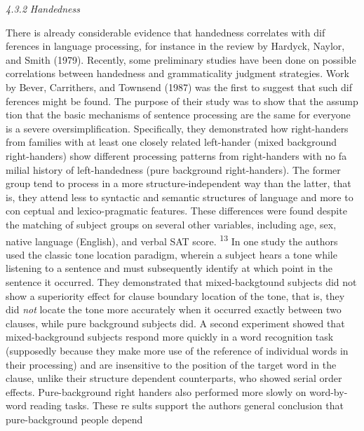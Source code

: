 \begin{styleStandard}
\textit{4.3.}\textit{2}\textit{ }\textit{Handedness}
\end{styleStandard}


\begin{styleTextbody}
There is already considerable evidence that handedness correlates with dif\- ferences in language processing, for instance in the review by Hardyck, Naylor, and Smith (1979). Recently, some preliminary studies have been done on possible correlations between handedness and grammaticality judgment strategies. Work by Bever, Carrithers, and Townsend (1987) was the first to suggest that such dif\- ferences might be found. The purpose of their study was to show that the assump\- tion that the basic mechanisms of sentence processing are the same for everyone is a severe oversimplification. Specifically, they demonstrated how right-handers from families with at least one closely related left-hander ({\textquotedbl}mixed background right-handers{\textquotedbl}) show different processing patterns from right-handers with no fa\- milial history of left-handedness ({\textquotedbl}pure background right-handers{\textquotedbl}). The former group tend to process in a more structure-independent way than the latter, that is, they attend less to syntactic and semantic structures of language and more to con\- ceptual and lexico-pragmatic features. These differences were found despite the matching of subject groups on several other variables, including age, sex, native language (English), and verbal SAT score. \textsuperscript{13}\textsuperscript{ }In one study the authors used the classic tone location paradigm, wherein a subject hears a tone while listening to a sentence and must subsequently identify at which point in the sentence it occurred. They demonstrated that mixed-backgtound subjects did not show a superiority effect for clause boundary location of the tone, that is, they did \textit{not}\textit{ }locate the tone more accurately when it occurred exactly between two clauses, while pure\- background subjects did. A second experiment showed that mixed-background subjects respond more quickly in a word recognition task (supposedly because they {\textquotedbl}make more use of the reference of individual words in their processing{\textquotedbl}) and are insensitive to the position of the target word in the clause, unlike their structure\- dependent counterparts, who showed serial order effects. Pure-background right\- handers also performed more slowly on word-by-word reading tasks. These re\- sults support the authors{\textquotesingle} general conclusion that pure-background people depend
\end{styleTextbody}


